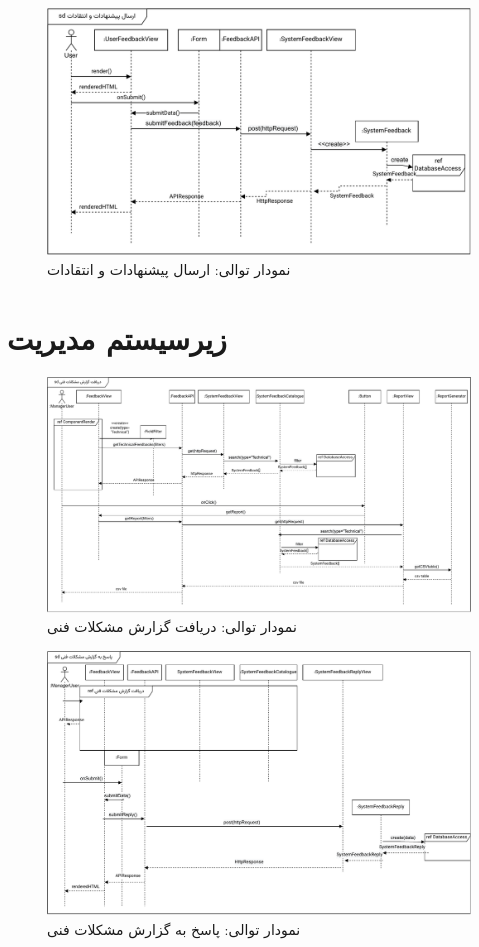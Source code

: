 \begin{figure}[ht!]
	\centering
	\includegraphics[scale=0.8]{figs/design-sequence/3-30.pdf}
	\caption{نمودار توالی: ارسال پیشنهادات و انتقادات}
\end{figure}

\FloatBarrier
\newpage

\section{زیرسیستم مدیریت}

\eject \pdfpagewidth=15in \pdfpageheight=9in

\FloatBarrier
\begin{figure}[ht!]
	\centering
	\includegraphics[scale=0.8]{figs/design-sequence/3-39.pdf}
	\caption{نمودار توالی: دریافت گزارش مشکلات فنی}
\end{figure}
\FloatBarrier
\newpage

\eject \pdfpagewidth=12in \pdfpageheight=9in


\begin{figure}[ht!]
	\centering
	\includegraphics[scale=0.8]{figs/design-sequence/3-40.pdf}
	\caption{نمودار توالی: پاسخ به گزارش مشکلات فنی}
\end{figure}


\recalctypearea
\newpage
